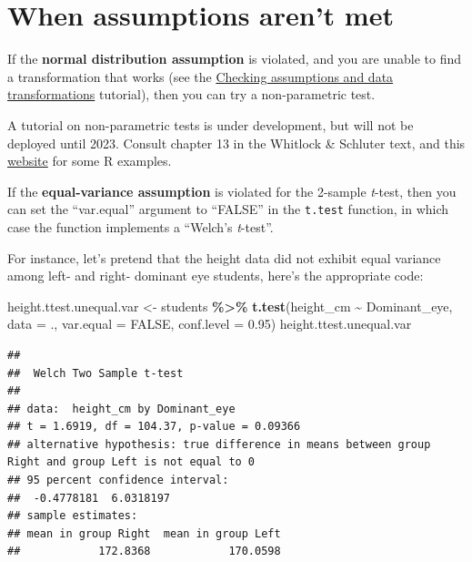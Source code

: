 \documentclass[
]{book}
\newenvironment{Shaded}{\begin{snugshade}}{\end{snugshade}}
\newcommand{\AttributeTok}[1]{\textcolor[rgb]{0.13,0.29,0.53}{#1}}
\newcommand{\ConstantTok}[1]{\textcolor[rgb]{0.56,0.35,0.01}{#1}}
\newcommand{\FloatTok}[1]{\textcolor[rgb]{0.00,0.00,0.81}{#1}}
\newcommand{\FunctionTok}[1]{\textcolor[rgb]{0.13,0.29,0.53}{\textbf{#1}}}
\newcommand{\NormalTok}[1]{#1}
\newcommand{\OtherTok}[1]{\textcolor[rgb]{0.56,0.35,0.01}{#1}}
\newcommand{\SpecialCharTok}[1]{\textcolor[rgb]{0.81,0.36,0.00}{\textbf{#1}}}
\begin{document}
\section{When assumptions aren't met}\label{assumpbad_2samp}

If the \textbf{normal distribution assumption} is violated, and you are unable to find a transformation that works (see the \hyperref[assumptions_packages_data]{Checking assumptions and data transformations} tutorial), then you can try a non-parametric test.

A tutorial on non-parametric tests is under development, but will not be deployed until 2023. Consult chapter 13 in the Whitlock \& Schluter text, and this \href{https://whitlockschluter3e.zoology.ubc.ca/RExamples/Rcode_Chapter_13.html\#new_methods_on_this_page}{website} for some R examples.

If the \textbf{equal-variance assumption} is violated for the 2-sample \emph{t}-test, then you can set the ``var.equal'' argument to ``FALSE'' in the \texttt{t.test} function, in which case the function implements a ``Welch's \emph{t}-test''.

For instance, let's pretend that the height data did not exhibit equal variance among left- and right- dominant eye students, here's the appropriate code:

\begin{Shaded}
\begin{Highlighting}[]
\NormalTok{height.ttest.unequal.var }\OtherTok{\textless{}{-}}\NormalTok{ students }\SpecialCharTok{\%\textgreater{}\%}
  \FunctionTok{t.test}\NormalTok{(height\_cm }\SpecialCharTok{\textasciitilde{}}\NormalTok{ Dominant\_eye, }
         \AttributeTok{data =}\NormalTok{ ., }\AttributeTok{var.equal =} \ConstantTok{FALSE}\NormalTok{, }\AttributeTok{conf.level =} \FloatTok{0.95}\NormalTok{)}
\NormalTok{height.ttest.unequal.var}
\end{Highlighting}
\end{Shaded}

\begin{verbatim}
## 
##  Welch Two Sample t-test
## 
## data:  height_cm by Dominant_eye
## t = 1.6919, df = 104.37, p-value = 0.09366
## alternative hypothesis: true difference in means between group Right and group Left is not equal to 0
## 95 percent confidence interval:
##  -0.4778181  6.0318197
## sample estimates:
## mean in group Right  mean in group Left 
##            172.8368            170.0598
\end{verbatim}
\end{document}
